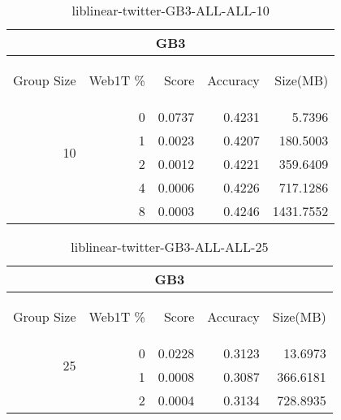 \begin{center}
\begin{table}[htbp]
\begin{tabular}{ | r | r | r | r | r |}
\hline
\multicolumn{5}{|c|}{GB3}\\
\hline
\begin{sideways}Group Size\end{sideways} & \begin{sideways}Web1T \%\end{sideways} & \begin{sideways}Score\end{sideways} & \begin{sideways}Accuracy\end{sideways} & \begin{sideways}Size(MB)\end{sideways}\\
\hline
\multirow{4}{*}{10}
 & 0 & 0.0737 & 0.4231 & 5.7396\\ \cline{2-5}
 & 1 & 0.0023 & 0.4207 & 180.5003\\ \cline{2-5}
 & 2 & 0.0012 & 0.4221 & 359.6409\\ \cline{2-5}
 & 4 & 0.0006 & 0.4226 & 717.1286\\ \cline{2-5}
 & 8 & 0.0003 & 0.4246 & 1431.7552\\ \cline{2-5}
\hline
\end{tabular}
\caption{liblinear-twitter-GB3-ALL-ALL-10}
\label{table:liblinear-twitter-GB3-ALL-ALL-10}
\end{table}
\end{center}

\begin{center}
\begin{table}[htbp]
\begin{tabular}{ | r | r | r | r | r |}
\hline
\multicolumn{5}{|c|}{GB3}\\
\hline
\begin{sideways}Group Size\end{sideways} & \begin{sideways}Web1T \%\end{sideways} & \begin{sideways}Score\end{sideways} & \begin{sideways}Accuracy\end{sideways} & \begin{sideways}Size(MB)\end{sideways}\\
\hline
\multirow{2}{*}{25}
 & 0 & 0.0228 & 0.3123 & 13.6973\\ \cline{2-5}
 & 1 & 0.0008 & 0.3087 & 366.6181\\ \cline{2-5}
 & 2 & 0.0004 & 0.3134 & 728.8935\\ \cline{2-5}
\hline
\end{tabular}
\caption{liblinear-twitter-GB3-ALL-ALL-25}
\label{table:liblinear-twitter-GB3-ALL-ALL-25}
\end{table}
\end{center}

